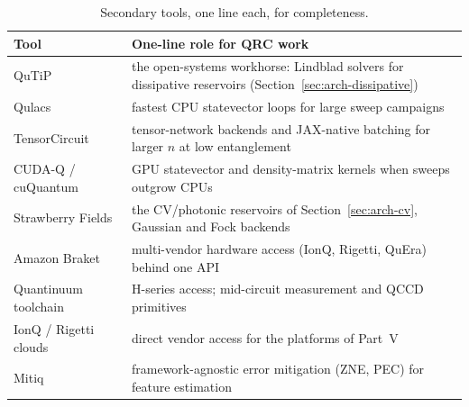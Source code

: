 \begin{table}[h]
\centering\small
\caption{Secondary tools, one line each, for completeness.}
\label{tab:secondary-tools}
\begin{tabular}{@{}lp{10.6cm}@{}}
\toprule
Tool & One-line role for QRC work \\
\midrule
QuTiP~\citep{johansson2012qutip} & the open-systems workhorse: Lindblad solvers for dissipative reservoirs (Section~\ref{sec:arch-dissipative}) \\
Qulacs~\citep{suzuki2021qulacs} & fastest CPU statevector loops for large sweep campaigns \\
TensorCircuit~\citep{zhang2023tensorcircuit} & tensor-network backends and JAX-native batching for larger $n$ at low entanglement \\
CUDA-Q / cuQuantum & GPU statevector and density-matrix kernels when sweeps outgrow CPUs \\
Strawberry Fields~\citep{killoran2019strawberry} & the CV/photonic reservoirs of Section~\ref{sec:arch-cv}, Gaussian and Fock backends \\
Amazon Braket & multi-vendor hardware access (IonQ, Rigetti, QuEra) behind one API \\
Quantinuum toolchain & H-series access; mid-circuit measurement and QCCD primitives \\
IonQ / Rigetti clouds & direct vendor access for the platforms of Part~V \\
Mitiq~\citep{larose2022mitiq} & framework-agnostic error mitigation (ZNE, PEC) for feature estimation \\
\bottomrule
\end{tabular}
\end{table}
